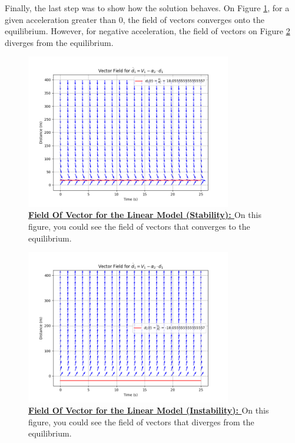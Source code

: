 \documentclass{article}
\begin{document}
		Finally, the last step was to show how the solution behaves. On Figure \ref{fig:FV1}, for a given acceleration greater than 0, the field of vectors converges onto the equilibrium. However, for negative acceleration, the field of vectors on Figure \ref{fig:FV2} diverges from the equilibrium.
		
		\begin{figure}[H]
			\centering
			\includegraphics[width=0.8\textwidth]{FieldOfVector_CV.png}
			\caption[Field Of Vector for the Linear Model (Stability)]{\textbf{\underline{Field Of Vector for the Linear Model (Stability): }} On this figure, you could see the field of vectors that converges to the equilibrium.}
			\label{fig:FV1}
		\end{figure}
		
		\begin{figure}[H]
			\centering
			\includegraphics[width=0.8\textwidth]{FieldOfVector_DV.png}
			\caption[Field Of Vector for the Linear Model (Instability)]{\textbf{\underline{Field Of Vector for the Linear Model (Instability): }} On this figure, you could see the field of vectors that diverges from the equilibrium.}
			\label{fig:FV2}
		\end{figure}
		
\end{document}
